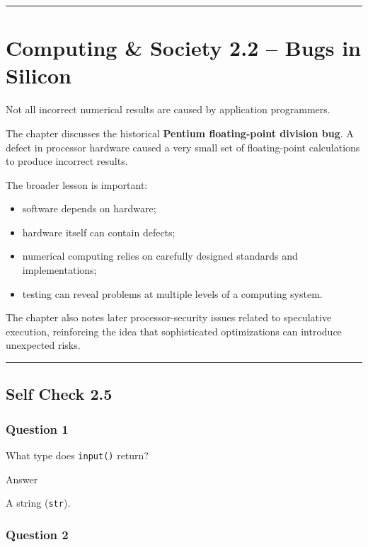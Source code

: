 \documentclass[
]{article}
\providecommand{\tightlist}{%
  \setlength{\itemsep}{0pt}\setlength{\parskip}{0pt}}
\begin{document}
\begin{center}\rule{0.5\linewidth}{0.5pt}\end{center}

\section{Computing \& Society 2.2 -- Bugs in
Silicon}\label{computing-society-2.2-bugs-in-silicon}

Not all incorrect numerical results are caused by application
programmers.

The chapter discusses the historical \textbf{Pentium floating-point
division bug}. A defect in processor hardware caused a very small set of
floating-point calculations to produce incorrect results.

The broader lesson is important:

\begin{itemize}
\tightlist
\item
  software depends on hardware;
\item
  hardware itself can contain defects;
\item
  numerical computing relies on carefully designed standards and
  implementations;
\item
  testing can reveal problems at multiple levels of a computing system.
\end{itemize}

The chapter also notes later processor-security issues related to
speculative execution, reinforcing the idea that sophisticated
optimizations can introduce unexpected risks.

\begin{center}\rule{0.5\linewidth}{0.5pt}\end{center}

\subsection{Self Check 2.5}\label{self-check-2.5}

\subsubsection{Question 1}\label{question-1-4}

What type does \texttt{input()} return?

Answer

A string (\texttt{str}).

\subsubsection{Question 2}\label{question-2-4}
\end{document}
